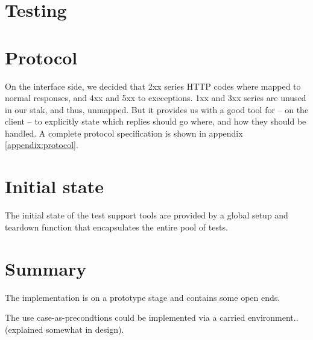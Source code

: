 \section{Testing}

\section{Protocol}
On the interface side, we decided that 2xx series HTTP codes where mapped to normal responses, and 4xx and 5xx to execeptions. 1xx and 3xx series are unused in our stak, and thus, unmapped. But it provides us with a good tool for -- on the client -- to explicitly state which replies should go where, and how they should be handled. A complete protocol specification is shown in appendix \ref{appendix:protocol}.

\section{Initial state}
The initial state of the test support tools are provided by a global setup and teardown function that encapsulates the entire pool of tests.

\section{Summary}
The implementation is on a prototype stage and contains some open ends.

The use case-as-precondtions could be implemented via a carried environment.. (explained somewhat in design).
